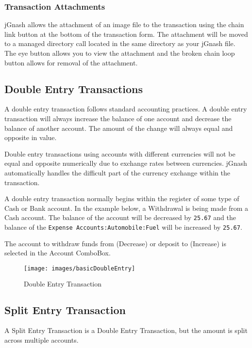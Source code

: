 \documentclass[letterpaper,12pt]{book}
\begin{document}
    \subsubsection*{Transaction Attachments}
    jGnash allows the attachment of an image file to the transaction using the chain link button at the bottom of the
    transaction form. The attachment will be moved to a managed directory call  located in the
    same directory as your jGnash file. The eye button allows you to view the attachment and the broken chain loop
    button allows for removal of the attachment.

    \subsection{Double Entry Transactions}
    A double entry transaction follows standard accounting practices. A double entry transaction will always
    increase the balance of one account and decrease the balance of another account. The amount of the change will
    always equal and opposite in value.

    \begin{mdframed}[style=info]
        Double entry transactions using accounts with different currencies will not be equal and opposite numerically due
        to exchange rates between currencies. jGnash automatically handles the difficult part of the currency exchange
        within the transaction.
    \end{mdframed}

    A double entry transaction normally begins within the register of some type of Cash or Bank account.
    In the example below, a Withdrawal is being made from a Cash account. The balance of the account will be decreased
    by \texttt{25.67} and the balance of the \texttt{Expense Accounts:Automobile:Fuel} will be increased by \texttt{25.67}.

    The account to withdraw funds from (Decrease) or deposit to (Increase) is selected in the Account ComboBox.

    \begin{figure}[h]
        \caption{Double Entry Transaction}
        \texttt{[image: images/basicDoubleEntry]}
    \end{figure}

    \subsection{Split Entry Transaction}
    A Split Entry Transaction is a Double Entry Transaction, but the amount is split across multiple accounts.
\end{document}

